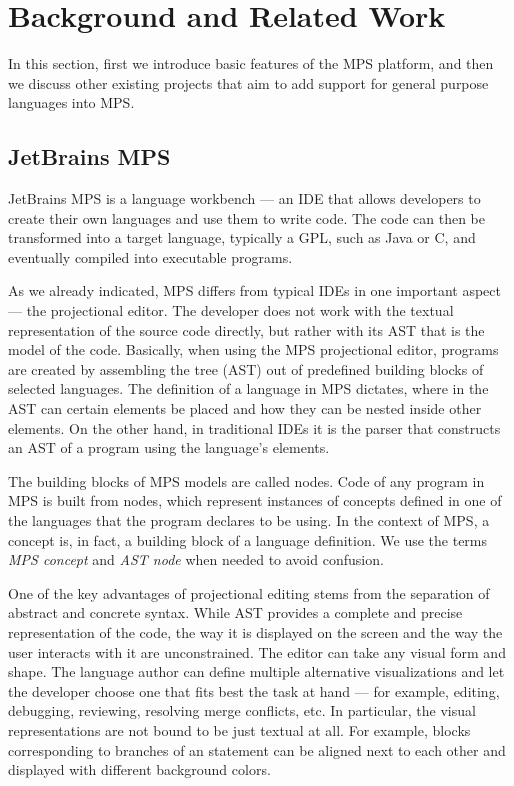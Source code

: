 \section{Background and Related Work}
\label{sect:BACKGRELWORK}

In this section, first we introduce basic features of the MPS platform, and then we discuss other existing projects that aim to add support for general purpose languages into MPS.

\subsection{JetBrains MPS}
\label{sect:MPS}


JetBrains MPS is a language workbench --- an IDE that allows developers to create their own languages and use them to write code.
The code can then be transformed into a target language, typically a GPL, such as Java or C, and eventually compiled into executable programs.

As we already indicated, MPS differs from typical IDEs in one important aspect --- the projectional editor.
The developer does not work with the textual representation of the source code directly, but rather with its AST that is the model of the code.
Basically, when using the MPS projectional editor, programs are created by assembling the tree (AST) out of predefined building blocks of selected languages.
The definition of a language in MPS dictates, where in the AST can certain elements be placed and how they can be nested inside other elements.
On the other hand, in traditional IDEs it is the parser that constructs an AST of a program using the language's elements.

The building blocks of MPS models are called nodes.
Code of any program in MPS is built from nodes, which represent instances of concepts defined in one of the languages that the program declares to be using.
 In the context of MPS, a concept is, in fact, a building block of a language definition.
We use the terms \emph{MPS concept} and \emph{AST node} when needed to avoid confusion.

One of the key advantages of projectional editing stems from the separation of abstract and concrete syntax.
While AST provides a complete and precise representation of the code, the way it is displayed on the screen and the way the user interacts with it are unconstrained.
The editor can take any visual form and shape.
The language author can define multiple alternative visualizations and let the developer choose one that fits best the task at hand --- for example, editing, debugging, reviewing, resolving merge conflicts, etc.
In particular, the visual representations are not bound to be just textual at all.
For example, blocks corresponding to branches of an  statement can be aligned next to each other and displayed with different background colors.

